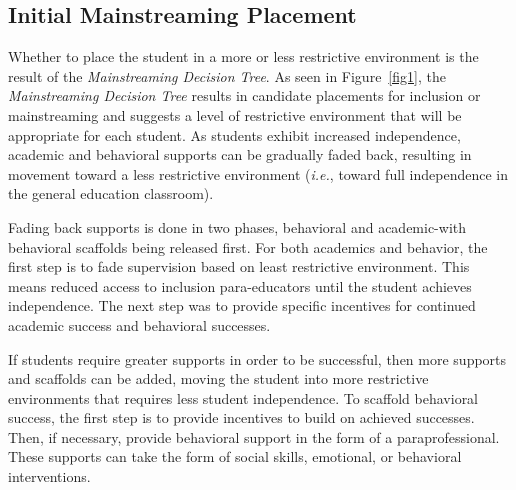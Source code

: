 \documentclass[twoside]{article}
\begin{document}
%
%
%
%
\subsection{Initial Mainstreaming Placement}
Whether to place the student in a more or less restrictive environment is the result of the \textit{Mainstreaming Decision Tree}. As seen in Figure~\ref{fig1}, the \textit{Mainstreaming Decision Tree} results in candidate placements for inclusion or mainstreaming and suggests a level of restrictive environment that will be appropriate for each student. As students exhibit increased independence, academic and behavioral supports can be gradually faded back, resulting in movement toward a less restrictive environment (\textit{i.e.}, toward full independence in the general education classroom). 

Fading back supports is done in two phases, behavioral and academic-with behavioral scaffolds being released first. For both academics and behavior, the first step is to fade supervision based on least restrictive environment. This means reduced access to inclusion para-educators until the student achieves independence. The next step was to provide specific incentives for continued academic success and behavioral successes. 

If students require greater supports in order to be successful, then more supports and scaffolds can be added, moving the student into more restrictive environments that requires less student independence. To scaffold behavioral success, the first step is to provide incentives to build on achieved successes. Then, if necessary, provide behavioral support in the form of a paraprofessional. These supports can take the form of social skills, emotional, or behavioral interventions. 
\end{document}
